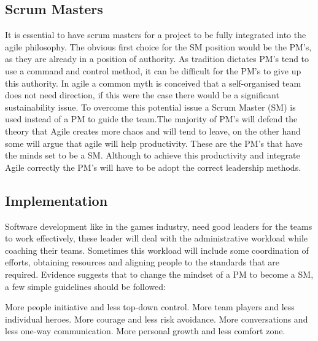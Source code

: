 \documentclass{scrartcl}
\begin{document}
\subsection{Scrum Masters}

It is essential to have scrum masters for a project to be fully integrated into the agile philosophy\cite{Together}. The obvious first choice for the SM position would be the PM's, as they are already in a position of authority. As tradition dictates PM's tend to use a command and control method\cite{ManagerMaster}, it can be difficult for the PM's to give up this authority\cite{Together}. In agile a common myth is conceived that a self-organised team does not need direction, if this were the case there would be a significant sustainability issue\cite{Oxymoron,Together}. To overcome this potential issue a Scrum Master (SM) is used instead of a PM to guide the team\cite{ManagerMaster}.The majority of PM's will defend the theory that Agile creates more chaos and will tend to leave\cite{Together,ready}, on the other hand some will argue that agile will help productivity. These are the PM's that have the minds set to be a SM. Although to achieve this productivity and integrate Agile correctly the PM's will have to be adopt the correct leadership methods.

\subsection{Implementation}

Software development like in the games industry, need good leaders for the teams to work effectively, these leader will deal with the administrative workload while coaching their teams. Sometimes this workload will include some coordination of efforts, obtaining resources and aligning people to the standards that are required\cite{Oxymoron,Together,Behavior,ManagerMaster}. Evidence suggests that to change the mindset of a PM to become a SM, a few simple guidelines should be followed:
\begin{center}
	More people initiative and less top-down control.
		\newline
	More team players and less individual heroes.
		\newline
	More courage and less risk avoidance.
		\newline
	More conversations and less one-way communication.
		\newline
	More personal growth and less comfort zone\cite{AdoptAgile}.
		\newline
\end{center}
\end{document}
